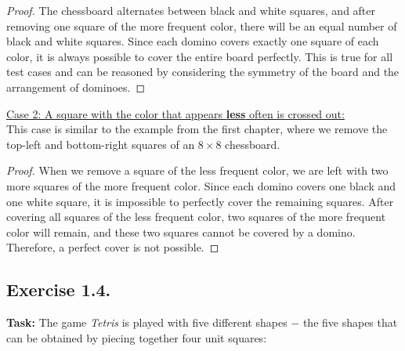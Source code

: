 \documentclass{article}
\begin{document}
\begin{proof} The chessboard alternates between black and white squares, and after removing one square of the more frequent color, there will be an equal number of black and white squares. Since each domino covers exactly one square of each color, it is always possible to cover the entire board perfectly. This is true for all test cases and can be reasoned by considering the symmetry of the board and the arrangement of dominoes. \end{proof}

\underline{Case 2: A square with the color that appears \textbf{less} often is crossed out:}\\
This case is similar to the example from the first chapter, where we remove the top-left and bottom-right squares of an $8 \times 8$ chessboard.

\begin{proof} When we remove a square of the less frequent color, we are left with two more squares of the more frequent color. Since each domino covers one black and one white square, it is impossible to perfectly cover the remaining squares. After covering all squares of the less frequent color, two squares of the more frequent color will remain, and these two squares cannot be covered by a domino. Therefore, a perfect cover is not possible. \end{proof}

\newpage

\subsection{Exercise 1.4.}
\textbf{Task:} The game \textit{Tetris} is played with five different shapes $-$ the five shapes that can be obtained by piecing together four unit squares:\\
\end{document}
